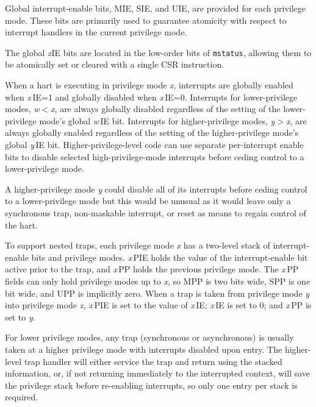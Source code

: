 Global interrupt-enable bits, MIE, SIE, and UIE, are provided for each
privilege mode.  These bits are primarily used to guarantee atomicity
with respect to interrupt handlers in the current privilege mode.

\begin{commentary}
The global {\em x}IE bits are located in the low-order bits of {\tt mstatus},
allowing them to be atomically set or cleared with a single CSR
instruction.
\end{commentary}

When a hart is executing in privilege mode {\em x}, interrupts are
globally enabled when {\em x}\,IE=1 and globally disabled when {\em
  x}\,IE=0.  Interrupts for lower-privilege modes, {\em w}$<${\em x},
are always globally disabled regardless of the setting of the
lower-privilege mode's global {\em w}\,IE bit.  Interrupts for
higher-privilege modes, {\em y}$>${\em x}, are always globally enabled
regardless of the setting of the higher-privilege mode's global {\em
  y}\,IE bit.  Higher-privilege-level code can use separate
per-interrupt enable bits to disable selected high-privilege-mode
interrupts before ceding control to a lower-privilege mode.

\begin{commentary}
  A higher-privilege mode {\em y} could disable all of its interrupts
  before ceding control to a lower-privilege mode but this would be
  unusual as it would leave only a synchronous trap, non-maskable
  interrupt, or reset as means to regain control of the hart.
\end{commentary}

To support nested traps, each privilege mode {\em x} has a two-level
stack of interrupt-enable bits and privilege modes.  {\em x}\,PIE
holds the value of the interrupt-enable bit active prior to the trap,
and {\em x}\,PP holds the previous privilege mode.  The {\em x}\,PP
fields can only hold privilege modes up to {\em x}, so MPP is
two bits wide, SPP is one bit wide, and UPP is implicitly zero.  When
a trap is taken from privilege mode {\em y} into privilege mode {\em
  x}, {\em x}\,PIE is set to the value of {\em x}\,IE; {\em x}\,IE is set to
0; and {\em x}\,PP is set to {\em y}.

\begin{commentary}
For lower privilege modes, any trap (synchronous or asynchronous) is
usually taken at a higher privilege mode with interrupts disabled upon entry.
The higher-level trap handler will either service the trap and return
using the stacked information, or, if not returning immediately to the
interrupted context, will save the privilege stack before re-enabling
interrupts, so only one entry per stack is required.
\end{commentary}

